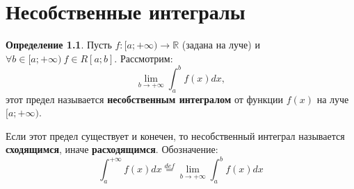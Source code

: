 \documentclass{report}
\theoremstyle{definition}
\newtheorem{definition}{Определение}[section]
\begin{document}
\chapter{Несобственные интегралы}

\begin{definition}
  Пусть $f:[a;+\infty)\rightarrow\mathbb{R}$ (задана на луче) и $\forall b \in [a;+\infty) \ f\in R[a;b]$.
  Рассмотрим:
  \begin{equation*}
    \underset{b\rightarrow+\infty}{\lim}\int_{a}^{b}f(x)dx,
  \end{equation*}
  этот предел называется \textbf{несобственным интегралом} от функции $f(x)$ на луче $[a;+\infty)$.

  Если этот предел существует и конечен, то несобственный интеграл называется \textbf{сходящимся}, иначе
  \textbf{расходящимся}. Обозначение:
  \begin{equation*}
    \int_{a}^{+\infty}f(x)dx \overset{def}{=}\underset{b\rightarrow+\infty}{\lim}\int_{a}^{b}f(x)dx
  \end{equation*}
\end{definition}
\end{document}
